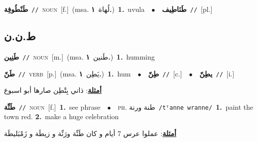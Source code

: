 \documentclass[10pt,a4paper,twoside]{article} %
\begin{document}
\begin{multicols}{2}
{\setlength\topsep{0pt}\textbf{\foreignlanguage{arabic}{طَنْطُوفِة}}\ {\color{gray}\texttt{//}\color{black}}\ \textsc{noun}\ [f.]\ \color{gray}(msa. \foreignlanguage{arabic}{لُهاة}~\foreignlanguage{arabic}{\textbf{١.}})\color{black}\ \textbf{1.}~uvula\ \ $\bullet$\ \ \setlength\topsep{0pt}\textbf{\foreignlanguage{arabic}{طَنَاطِيف}}\ {\color{gray}\texttt{//}\color{black}}\ [pl.]\ } \vspace{2mm}

\vspace{-3mm}
\subsection*{\color{blue}\foreignlanguage{arabic}{ط.ن.ن}\color{blue}{}} 

{\setlength\topsep{0pt}\textbf{\foreignlanguage{arabic}{طَنِين}}\ {\color{gray}\texttt{//}\color{black}}\ \textsc{noun}\ [m.]\ \color{gray}(msa. \foreignlanguage{arabic}{طَنين}~\foreignlanguage{arabic}{\textbf{١.}})\color{black}\ \textbf{1.}~humming\ } \vspace{2mm}

{\setlength\topsep{0pt}\textbf{\foreignlanguage{arabic}{طَنّ}}\ {\color{gray}\texttt{//}\color{black}}\ \textsc{verb}\ [p.]\ \color{gray}(msa. \foreignlanguage{arabic}{يَطِن}~\foreignlanguage{arabic}{\textbf{١.}})\color{black}\ \textbf{1.}~hum\ \ $\bullet$\ \ \setlength\topsep{0pt}\textbf{\foreignlanguage{arabic}{طِنّ}}\ {\color{gray}\texttt{//}\color{black}}\ [c.]\ \ $\bullet$\ \ \setlength\topsep{0pt}\textbf{\foreignlanguage{arabic}{يطِنّ}}\ {\color{gray}\texttt{//}\color{black}}\ [i.]\  \begin{flushright}\color{gray}\foreignlanguage{arabic}{\textbf{\underline{\foreignlanguage{arabic}{أمثلة}}}: ذاني بِتْطِن صارها أبو اسبوع}\end{flushright}\color{black}} \vspace{2mm}

{\setlength\topsep{0pt}\textbf{\foreignlanguage{arabic}{طَنِّة}}\ {\color{gray}\texttt{//}\color{black}}\ \textsc{noun}\ [f.]\ \textbf{1.}~see phrase\ \ $\bullet$\ \ \textsc{ph.} \color{gray} \foreignlanguage{arabic}{طنة ورنة}\color{black}\ {\color{gray}\texttt{/{\sffamily tˤanne wranne}/}\color{black}}\ \textbf{1.}~paint the town red.  \textbf{2.}~make a huge celebration\  \begin{flushright}\color{gray}\foreignlanguage{arabic}{\textbf{\underline{\foreignlanguage{arabic}{أمثلة}}}: عملوا عرس 7 أيام و كان طَنِّة ورَنِّة و زيطَة و زَمْبَليطَة}\end{flushright}\color{black}} \vspace{2mm}


\end{multicols}
\end{document}
